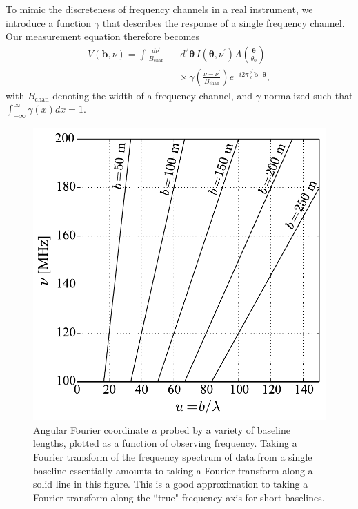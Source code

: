 \documentclass[twocolumn,aps,prd,nofootinbib,showpacs]{revtex4-1}
\begin{document}
To mimic the discreteness of frequency channels in a real instrument, we introduce a function $\gamma$ that describes the response of a single frequency channel.  Our measurement equation therefore becomes
\begin{eqnarray}
\label{eq:measEqn}
V(\mathbf{b}, \nu) = \int   \frac{d\nu^\prime}{B_\textrm{chan}} && d^2 \boldsymbol{\theta} \, I (\boldsymbol \theta, \nu^\prime)  A \left( \frac{\boldsymbol \theta}{\theta_0} \right) \nonumber \\
&& \times \, \gamma\left( \frac{\nu-\nu^\prime}{B_\textrm{chan}} \right)   e^{ - i 2 \pi \frac{\nu^\prime}{c} \mathbf{b} \cdot \boldsymbol \theta }  ,
\end{eqnarray}
with $B_\textrm{chan}$ denoting the width of a frequency channel, and $\gamma$ normalized such that $\int_{-\infty}^\infty  \gamma (x) dx = 1$.

\begin{figure}[t!] 
	\centering 
	\includegraphics[width=.4\textwidth]{chromaticBaselines.pdf}
	\caption{Angular Fourier coordinate $u$ probed by a variety of baseline lengths, plotted as a function of observing frequency.  Taking a Fourier transform of the frequency spectrum of data from a single baseline essentially amounts to taking a Fourier transform along a solid line in this figure.  This is a good approximation to taking a Fourier transform along the ``true" frequency axis for short baselines.}
	\label{fig:ChromaticBaselines}
\end{figure} 
\end{document}
